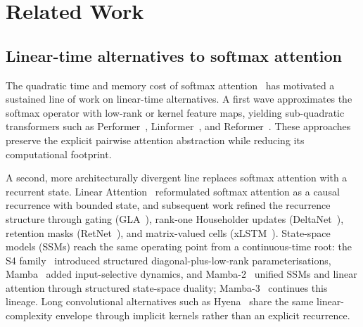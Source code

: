 \chapter{Related Work}\label{ch:related}

\section{Linear-time alternatives to softmax attention}

The quadratic time and memory cost of softmax
attention~\cite{vaswani2017attention} has motivated a sustained
line of work on linear-time alternatives. A first wave
approximates the softmax operator with low-rank or kernel feature
maps, yielding sub-quadratic transformers such as
Performer~\cite{choromanski2021performer},
Linformer~\cite{wang2020linformer}, and
Reformer~\cite{kitaev2020reformer}. These approaches preserve the
explicit pairwise attention abstraction while reducing its
computational footprint.

A second, more architecturally divergent line replaces softmax
attention with a recurrent state. Linear
Attention~\cite{katharopoulos2020transformers} reformulated
softmax attention as a causal recurrence with bounded state, and
subsequent work refined the recurrence structure through gating
(GLA~\cite{yang2024gla}), rank-one Householder updates
(DeltaNet~\cite{schlag2021deltanet,yang2024deltanet}), retention
masks (RetNet~\cite{sun2023retnet}), and matrix-valued cells
(xLSTM~\cite{beck2024xlstm}). State-space models (SSMs) reach the
same operating point from a continuous-time root: the S4
family~\cite{gu2022s4} introduced structured diagonal-plus-low-rank
parameterisations, Mamba~\cite{gu2023mamba} added input-selective
dynamics, and Mamba-2~\cite{dao2024transformers} unified SSMs and
linear attention through structured state-space duality;
Mamba-3~\cite{lahoti2026mamba3} continues this lineage. Long
convolutional alternatives such as Hyena~\cite{poli2023hyena}
share the same linear-complexity envelope through implicit
kernels rather than an explicit recurrence.

